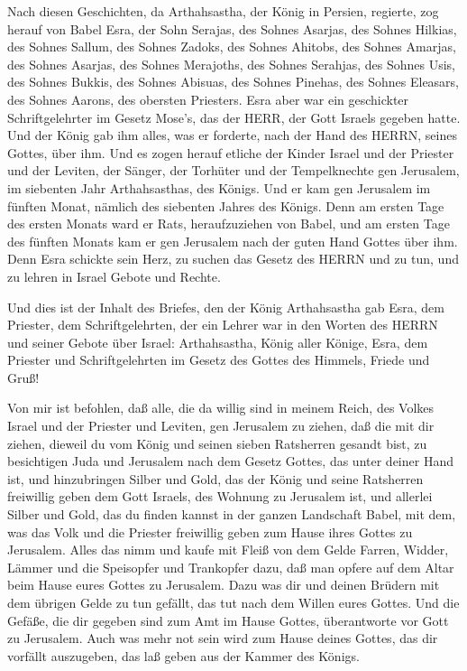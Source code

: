  Nach diesen Geschichten, da Arthahsastha, der König in
Persien, regierte, zog herauf von Babel Esra, der Sohn Serajas, des
Sohnes Asarjas, des Sohnes Hilkias,  des Sohnes Sallum, des
Sohnes Zadoks, des Sohnes Ahitobs,  des Sohnes Amarjas, des
Sohnes Asarjas, des Sohnes Merajoths,  des Sohnes Serahjas,
des Sohnes Usis, des Sohnes Bukkis,  des Sohnes Abisuas, des
Sohnes Pinehas, des Sohnes Eleasars, des Sohnes Aarons, des obersten
Priesters.  Esra aber war ein geschickter Schriftgelehrter
im Gesetz Mose's, das der HERR, der Gott Israels gegeben hatte. Und der
König gab ihm alles, was er forderte, nach der Hand des HERRN, seines
Gottes, über ihm.  Und es zogen herauf etliche der Kinder
Israel und der Priester und der Leviten, der Sänger, der Torhüter und
der Tempelknechte gen Jerusalem, im siebenten Jahr Arthahsasthas, des
Königs.  Und er kam gen Jerusalem im fünften Monat, nämlich
des siebenten Jahres des Königs.  Denn am ersten Tage des
ersten Monats ward er Rats, heraufzuziehen von Babel, und am ersten Tage
des fünften Monats kam er gen Jerusalem nach der guten Hand Gottes über
ihm.  Denn Esra schickte sein Herz, zu suchen das Gesetz
des HERRN und zu tun, und zu lehren in Israel Gebote und Rechte.

 Und dies ist der Inhalt des Briefes, den der König
Arthahsastha gab Esra, dem Priester, dem Schriftgelehrten, der ein
Lehrer war in den Worten des HERRN und seiner Gebote über Israel:
 Arthahsastha, König aller Könige, Esra, dem Priester und
Schriftgelehrten im Gesetz des Gottes des Himmels, Friede und Gruß!

 Von mir ist befohlen, daß alle, die da willig sind in
meinem Reich, des Volkes Israel und der Priester und Leviten, gen
Jerusalem zu ziehen, daß die mit dir ziehen,  dieweil du
vom König und seinen sieben Ratsherren gesandt bist, zu besichtigen Juda
und Jerusalem nach dem Gesetz Gottes, das unter deiner Hand ist,
 und hinzubringen Silber und Gold, das der König und seine
Ratsherren freiwillig geben dem Gott Israels, des Wohnung zu Jerusalem
ist,  und allerlei Silber und Gold, das du finden kannst in
der ganzen Landschaft Babel, mit dem, was das Volk und die Priester
freiwillig geben zum Hause ihres Gottes zu Jerusalem. 
Alles das nimm und kaufe mit Fleiß von dem Gelde Farren, Widder, Lämmer
und die Speisopfer und Trankopfer dazu, daß man opfere auf dem Altar
beim Hause eures Gottes zu Jerusalem.  Dazu was dir und
deinen Brüdern mit dem übrigen Gelde zu tun gefällt, das tut nach dem
Willen eures Gottes.  Und die Gefäße, die dir gegeben sind
zum Amt im Hause Gottes, überantworte vor Gott zu Jerusalem.
 Auch was mehr not sein wird zum Hause deines Gottes, das
dir vorfällt auszugeben, das laß geben aus der Kammer des Königs.

